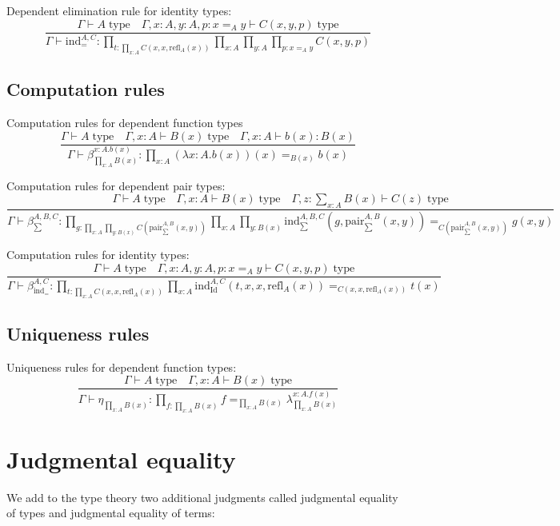 \documentclass{book}
\begin{document}
Dependent elimination rule for identity types:
$$\frac{\Gamma \vdash A \; \mathrm{type} \quad \Gamma, x:A, y:A, p:x =_A y \vdash C(x, y, p) \; \mathrm{type}}{\Gamma \vdash \mathrm{ind}_{=}^{A, C}:\prod_{t:\prod_{x:A} C(x, x, \mathrm{refl}_A(x))} \prod_{x:A} \prod_{y:A} \prod_{p:x =_A y} C(x, y, p)}$$

\subsection{Computation rules}

Computation rules for dependent function types
$$\frac{\Gamma \vdash A \; \mathrm{type} \quad \Gamma, x:A \vdash B(x) \; \mathrm{type} \quad \Gamma, x:A \vdash b(x):B(x)}{\Gamma \vdash \beta_{\prod_{x:A} B(x)}^{x:A.b(x)}:\prod_{x:A} (\lambda x:A.b(x))(x) =_{B(x)} b(x)}$$

Computation rules for dependent pair types:
$$\frac{\Gamma \vdash A \; \mathrm{type} \quad \Gamma, x:A \vdash B(x) \; \mathrm{type} \quad \Gamma, z:\sum_{x:A} B(x) \vdash C(z) \; \mathrm{type}}{\Gamma \vdash \beta_{\sum}^{A, B, C}:\prod_{g:\prod_{x:A} \prod_{y:B(x)} C(\mathrm{pair}_{\sum}^{A, B}(x, y))} \prod_{x:A} \prod_{y:B(x)} \mathrm{ind}_{\sum}^{A, B, C}(g, \mathrm{pair}_{\sum}^{A, B}(x, y)) =_{C(\mathrm{pair}_{\sum}^{A, B}(x, y))} g(x, y)}$$

Computation rules for identity types:
$$\frac{\Gamma \vdash A \; \mathrm{type} \quad \Gamma, x:A, y:A, p:x =_A y \vdash C(x, y, p) \; \mathrm{type}}{\Gamma \vdash \beta_{\mathrm{ind}_{=}}^{A, C}:\prod_{t:\prod_{x:A} C(x, x, \mathrm{refl}_A(x))} \prod_{x:A} \mathrm{ind}_{\mathrm{Id}}^{A, C}(t, x, x, \mathrm{refl}_A(x)) =_{C(x, x, \mathrm{refl}_A(x))} t(x)}$$

\subsection{Uniqueness rules}

Uniqueness rules for dependent function types:
$$\frac{\Gamma \vdash A \; \mathrm{type} \quad \Gamma, x:A \vdash B(x) \; \mathrm{type}}{\Gamma \vdash \eta_{\prod_{x:A} B(x)}:\prod_{f:\prod_{x:A} B(x)} f =_{\prod_{x:A} B(x)} \lambda_{\prod_{x:A} B(x)}^{x:A.f(x)}}$$

\section{Judgmental equality}

We add to the type theory two additional judgments called judgmental equality of types and judgmental equality of terms:
\end{document}
